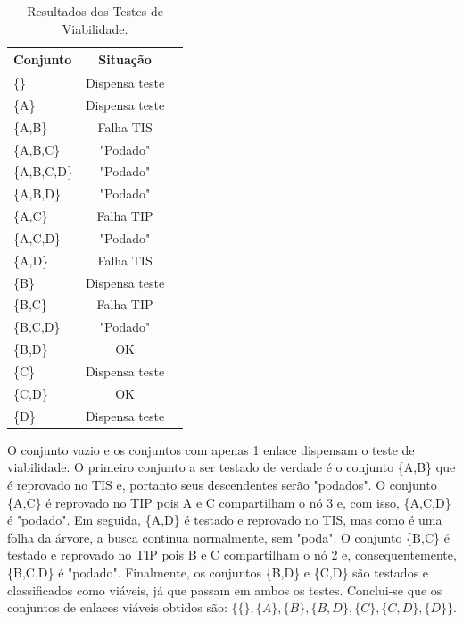 \begin{table}[h]
\centering
\caption[Resultados dos Testes de Viabilidade.]
{Resultados dos Testes de Viabilidade.}
\label{table:resultadoviabilidade}
\begin{tabular}{lcc}
\hline
Conjunto & Situação\\ \hline
\{\} & Dispensa teste\\
\{A\}	& Dispensa teste\\
\{A,B\}	& Falha TIS\\
\{A,B,C\}	& "Podado"\\
\{A,B,C,D\}	& "Podado"\\
\{A,B,D\}	& "Podado"\\
\{A,C\}	& Falha TIP\\
\{A,C,D\}	& "Podado"\\
\{A,D\}	& Falha TIS\\
\{B\}	& Dispensa teste\\
\{B,C\}	& Falha TIP\\
\{B,C,D\}	& "Podado"\\
\{B,D\}	& OK\\
\{C\}	& Dispensa teste\\
\{C,D\}	& OK\\
\{D\}	& Dispensa teste\\
\end{tabular}
\end{table}

O conjunto vazio e os conjuntos com apenas 1 enlace dispensam o teste de viabilidade. O primeiro conjunto a ser testado de verdade é o conjunto \{A,B\} que é reprovado no TIS e, portanto seus descendentes serão "podados". O conjunto \{A,C\} é reprovado no TIP pois A e C compartilham o nó 3 e, com isso, \{A,C,D\} é "podado". Em seguida, \{A,D\} é testado e reprovado no TIS, mas como é uma folha da árvore, a busca continua normalmente, sem "poda". O conjunto \{B,C\} é testado e reprovado no TIP pois B e C compartilham o nó 2 e, consequentemente, \{B,C,D\} é "podado". Finalmente, os conjuntos \{B,D\} e \{C,D\} são testados e classificados como viáveis, já que passam em ambos os testes.
Conclui-se que os conjuntos de enlaces viáveis obtidos são: $\{\{\},\{A\},\{B\},\{B,D\},\{C\},\{C,D\},\{D\}\}$. 

